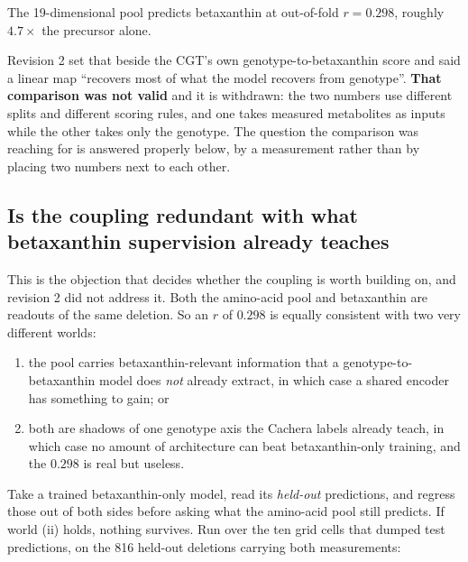  The 19-dimensional pool predicts betaxanthin at
out-of-fold $r = 0.298$, roughly $4.7\times$ the precursor alone.

Revision 2 set that beside the CGT's own genotype-to-betaxanthin score and said a linear map
``recovers most of what the model recovers from genotype''. \textbf{That comparison was not
valid} and it is withdrawn: the two numbers use different splits and different scoring
rules, and one takes measured metabolites as inputs while the other takes only the genotype.
The question the comparison was reaching for is answered properly below, by a measurement
rather than by placing two numbers next to each other.

\subsection{Is the coupling redundant with what betaxanthin supervision already teaches}
\label{sec:aa-redundancy}

This is the objection that decides whether the coupling is worth building on, and revision 2
did not address it. Both the amino-acid pool and betaxanthin are readouts of the same
deletion. So an $r$ of $0.298$ is equally consistent with two very different worlds:

\begin{enumerate}
\item[(i)] the pool carries betaxanthin-relevant information that a genotype-to-betaxanthin
  model does \emph{not} already extract, in which case a shared encoder has something to
  gain; or
\item[(ii)] both are shadows of one genotype axis the Cachera labels already teach, in which
  case no amount of architecture can beat betaxanthin-only training, and the $0.298$ is
  real but useless.
\end{enumerate}

 Take a trained betaxanthin-only model, read
its \emph{held-out} predictions, and regress those out of both sides before asking what the
amino-acid pool still predicts. If world (ii) holds, nothing survives. Run over the ten
grid cells that dumped test predictions, on the 816 held-out deletions carrying both
measurements:

